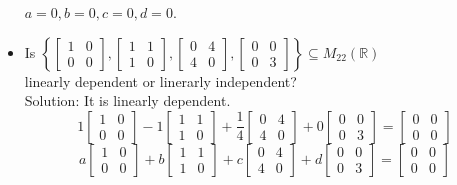 \documentclass[]{article}
\begin{document}
\begin{itemize}
$$			$$
			$a=0,b=0,c=0,d=0$.
			\item Is $\left\{ \begin{bmatrix} {1}&{0}\\{0}&{0} \end{bmatrix},\begin{bmatrix} {1}&{1}\\{1}&{0} \end{bmatrix},\begin{bmatrix} {0}&{4}\\{4}&{0} \end{bmatrix},\begin{bmatrix} {0}&{0}\\{0}&{3} \end{bmatrix} \right\}\subseteq M_{22}(\mathbb{R})$\\ linearly dependent or linerarly independent?\\
			Solution: It is linearly dependent.
			$$
				1\begin{bmatrix} {1}&{0}\\{0}&{0} \end{bmatrix}-1\begin{bmatrix} {1}&{1}\\{1}&{0} \end{bmatrix}+\frac{1}{4}\begin{bmatrix} {0}&{4}\\{4}&{0} \end{bmatrix}+0\begin{bmatrix} {0}&{0}\\{0}&{3} \end{bmatrix}=\begin{bmatrix}{0}&{0}\\{0}&{0}\end{bmatrix}
			$$
			\vspace{5mm}
			$$
				a\begin{bmatrix} {1}&{0}\\{0}&{0} \end{bmatrix}+b\begin{bmatrix} {1}&{1}\\{1}&{0} \end{bmatrix}+c\begin{bmatrix} {0}&{4}\\{4}&{0} \end{bmatrix}+d\begin{bmatrix} {0}&{0}\\{0}&{3} \end{bmatrix}=\begin{bmatrix}{0}&{0}\\{0}&{0}\end{bmatrix}
$$
\end{itemize}
\end{document}
